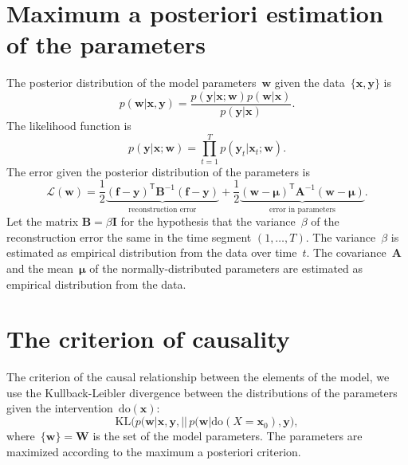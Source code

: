 \documentclass[12pt]{article}
\newcommand{\T}{^{\mathsf{T}}}
\newcommand{\eL}{\mathcal{L}}
\newcommand{\doc}{\mathrm{do}}
\begin{document}
\section{Maximum a posteriori estimation of the parameters}
The posterior distribution of the model parameters~$\mathbf{w}$ given the data~$\{\mathbf{x}, \mathbf{y}\}$ is
\[
    p(\mathbf{w}|\mathbf{x}, \mathbf{y}) = \frac{p(\mathbf{y}|\mathbf{x}; \mathbf{w}) p(\mathbf{w}|\mathbf{x})}{p(\mathbf{y}|\mathbf{x})}.
\]
The likelihood function is
\[
    p(\mathbf{y}|\mathbf{x}; \mathbf{w}) = \prod_{t=1}^T p(\mathbf{y}_t|\mathbf{x}_t; \mathbf{w}).
\]
The error given the posterior distribution of the parameters is
\[
    \eL(\mathbf{w}) = \frac{1}{2}
    \underbrace{
        (\mathbf{f}-\mathbf{y})\T \mathbf{B}^{-1}(\mathbf{f}-\mathbf{y})
    }_{\text{reconstruction error}}
    + \frac{1}{2}
    \underbrace{
        (\mathbf{w} - \boldsymbol{\mu})\T \mathbf{A}^{-1}(\mathbf{w} - \boldsymbol{\mu})
    }_{\text{error in parameters}}.
\]
Let the matrix $\mathbf{B}=\beta \mathbf{I}$ for the hypothesis that the variance~$\beta$ of the reconstruction error the same in the time segment $(1,\dots,T)$.
The variance~$\beta$ is estimated as empirical distribution from the data over time~$t$.
The covariance~$\mathbf{A}$ and the mean~$\boldsymbol{\mu}$ of the normally-distributed parameters are estimated as empirical distribution from the data.

\section{The criterion of causality}
The criterion of the causal relationship between the elements of the model,
we use the Kullback-Leibler divergence between the distributions of the parameters given the intervention~$\doc(\mathbf{x})$:
\[
    \text{KL}\bigl(p(\mathbf{w}|\mathbf{x},\mathbf{y},
    ||
    \,p(\mathbf{w}|\doc(X=\mathbf{x}_0),\mathbf{y}\bigr),\]
where~$\{\mathbf{w}\}=\mathbf{W}$ is the set of the model parameters.
The parameters are maximized according to the maximum a posteriori criterion.
\end{document}
